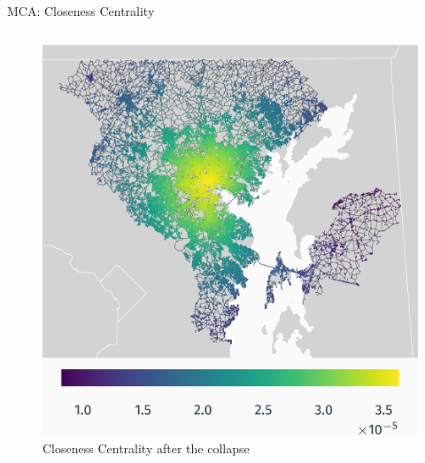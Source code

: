 \documentclass{beamer}
\numberwithin{figure}{section} %
\numberwithin{table}{section} %
\begin{document}
\begin{frame}{MCA: Closeness Centrality}
\begin{columns}
        \begin{column}{0.33\textwidth}
            \begin{figure}
                \centering
                \includegraphics[width=\textwidth]{maps/closeness_wo_bridge.png}
                {\scriptsize Closeness Centrality after the collapse}
            \end{figure}
        \end{column}


\end{columns}
\end{frame}
\end{document}
